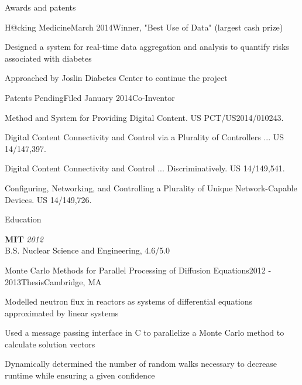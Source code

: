 \documentclass{resume}
\begin{document}
\begin{rSection}{Awards and patents}

\begin{rSubsection}{H@cking Medicine}{March 2014}{Winner, "Best Use of Data" (largest cash prize)}{}
\item Designed a system for real-time data aggregation and analysis to quantify risks associated with diabetes
\item Approached by Joslin Diabetes Center to continue the project
\end{rSubsection}



\begin{rSubsection}{Patents Pending}{Filed January 2014}{Co-Inventor}{}
\item Method and System for Providing Digital Content. US PCT/US2014/010243.
\item Digital Content Connectivity and Control via a Plurality of Controllers ... US 14/147,397.
\item Digital Content Connectivity and Control ... Discriminatively. US 14/149,541.
\item Configuring, Networking, and Controlling a Plurality of Unique Network-Capable Devices. US 14/149,726.
\end{rSubsection}
\end{rSection}

\begin{rSection}{Education}

{\bf MIT} \hfill {\em 2012} \\ 
B.S. Nuclear Science and Engineering, 4.6/5.0


\begin{rSubsection}{Monte Carlo Methods for Parallel Processing of Diffusion Equations}{2012 - 2013}{Thesis}{Cambridge, MA}
\item Modelled neutron flux in reactors as systems of differential equations approximated by linear systems
\item Used a message passing interface in C to parallelize a Monte Carlo method to calculate solution vectors
\item Dynamically determined the number of random walks necessary to decrease runtime while ensuring a given confidence
\end{rSubsection}

\end{rSection}
\end{document}
